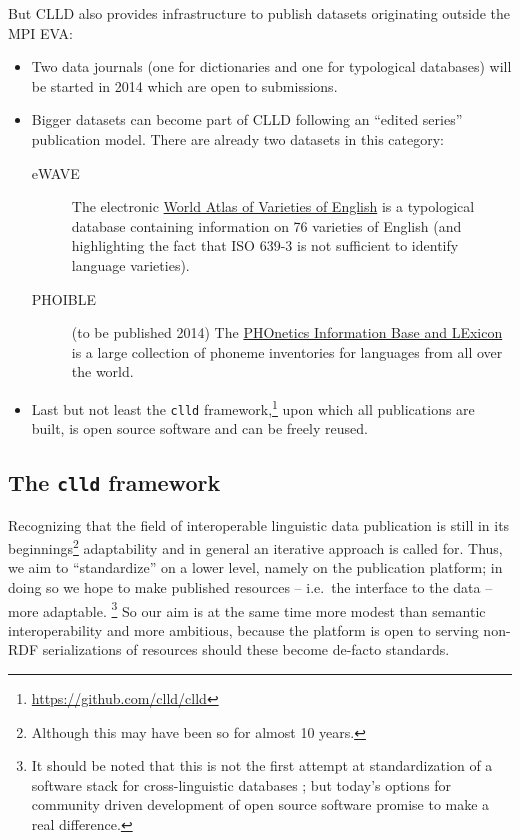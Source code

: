 \documentclass[a4paper,10pt]{article}
\begin{document}
But CLLD also provides infrastructure to publish datasets originating outside the MPI EVA:
\begin{itemize}
\item Two data journals (one for dictionaries and one for typological databases) will be started in 2014 which are open to submissions.
\item Bigger datasets can become part of CLLD following an ``edited series'' publication model. There are already two datasets in this category:
\begin{description}
\item[eWAVE] The electronic \href{http://ewave-atlas.org/}{World Atlas of Varieties of English} is a typological database containing information on 76 varieties of English (and highlighting the fact that ISO 639-3 is not sufficient to identify language varieties).
\item[PHOIBLE] (to be published 2014) The \href{http://phoible.org}{PHOnetics Information Base and LExicon} is a large collection of phoneme inventories for languages from all over the world.
\end{description}
\item Last but not least the \texttt{clld} framework,\footnote{\url{https://github.com/clld/clld}} upon which all publications are built, is open source software and can be freely reused.
\end{itemize}

\subsection{The \texttt{clld} framework}
Recognizing that the field of interoperable linguistic data publication is still in its
beginnings\footnote{Although this may have been so for almost 10 years.} adaptability and in general an
iterative approach is called for. Thus, we aim to ``standardize'' on a lower
level, namely on the publication platform; in doing so we hope to make published
resources -- i.e.~the interface to the data -- more adaptable.%
\footnote{It should be noted that this is not the first attempt at standardization of a software stack for cross-linguistic databases \cite{dimitriadis2002}; but today's options for community driven development of open source software promise to make a real difference.}
So our aim is at the same time more modest than
semantic interoperability and more ambitious, because the platform is open to serving non-RDF serializations
of resources should these become de-facto standards.
\end{document}
